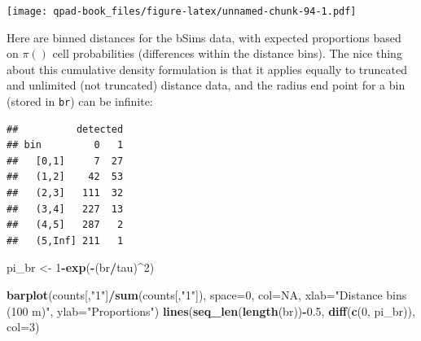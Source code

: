 \documentclass[12pt,]{book}
\newenvironment{Shaded}{\begin{snugshade}}{\end{snugshade}}
\newcommand{\DataTypeTok}[1]{\textcolor[rgb]{0.13,0.29,0.53}{#1}}
\newcommand{\DecValTok}[1]{\textcolor[rgb]{0.00,0.00,0.81}{#1}}
\newcommand{\FloatTok}[1]{\textcolor[rgb]{0.00,0.00,0.81}{#1}}
\newcommand{\KeywordTok}[1]{\textcolor[rgb]{0.13,0.29,0.53}{\textbf{#1}}}
\newcommand{\NormalTok}[1]{#1}
\newcommand{\OperatorTok}[1]{\textcolor[rgb]{0.81,0.36,0.00}{\textbf{#1}}}
\newcommand{\OtherTok}[1]{\textcolor[rgb]{0.56,0.35,0.01}{#1}}
\newcommand{\StringTok}[1]{\textcolor[rgb]{0.31,0.60,0.02}{#1}}
\begin{document}
\texttt{[image: qpad-book\_files/figure-latex/unnamed-chunk-94-1.pdf]}

Here are binned distances for the bSims data, with expected
proportions based on \(\pi()\) cell probabilities
(differences within the distance bins).
The nice thing about this cumulative density formulation
is that it applies equally to truncated and unlimited
(not truncated) distance data, and the radius end point
for a bin (stored in \texttt{br}) can be infinite:

\begin{Shaded}
\end{Shaded}

\begin{verbatim}
##          detected
## bin         0   1
##   [0,1]     7  27
##   (1,2]    42  53
##   (2,3]   111  32
##   (3,4]   227  13
##   (4,5]   287   2
##   (5,Inf] 211   1
\end{verbatim}

\begin{Shaded}
\begin{Highlighting}[]
\NormalTok{pi_br <-}\StringTok{ }\DecValTok{1}\OperatorTok{-}\KeywordTok{exp}\NormalTok{(}\OperatorTok{-}\NormalTok{(br}\OperatorTok{/}\NormalTok{tau)}\OperatorTok{^}\DecValTok{2}\NormalTok{)}

\KeywordTok{barplot}\NormalTok{(counts[,}\StringTok{"1"}\NormalTok{]}\OperatorTok{/}\KeywordTok{sum}\NormalTok{(counts[,}\StringTok{"1"}\NormalTok{]), }\DataTypeTok{space=}\DecValTok{0}\NormalTok{, }\DataTypeTok{col=}\OtherTok{NA}\NormalTok{,}
  \DataTypeTok{xlab=}\StringTok{"Distance bins (100 m)"}\NormalTok{, }\DataTypeTok{ylab=}\StringTok{"Proportions"}\NormalTok{)}
\KeywordTok{lines}\NormalTok{(}\KeywordTok{seq_len}\NormalTok{(}\KeywordTok{length}\NormalTok{(br))}\OperatorTok{-}\FloatTok{0.5}\NormalTok{, }\KeywordTok{diff}\NormalTok{(}\KeywordTok{c}\NormalTok{(}\DecValTok{0}\NormalTok{, pi_br)), }\DataTypeTok{col=}\DecValTok{3}\NormalTok{)}
\end{Highlighting}
\end{Shaded}
\end{document}
